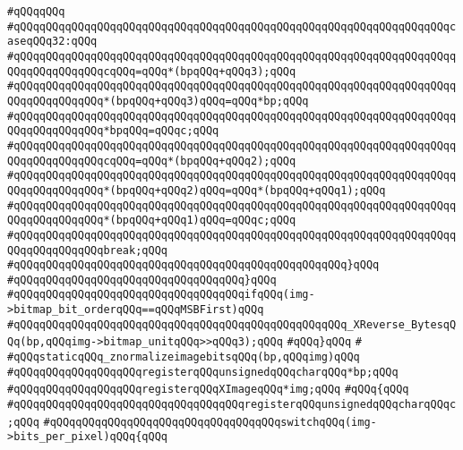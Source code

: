 \verb|#qQQqqQQq|\newline
\verb|#qQQqqQQqqQQqqQQqqQQqqQQqqQQqqQQqqQQqqQQqqQQqqQQqqQQqqQQqqQQqqQQqqQQqcaseqQQq32:qQQq|\newline
\verb|#qQQqqQQqqQQqqQQqqQQqqQQqqQQqqQQqqQQqqQQqqQQqqQQqqQQqqQQqqQQqqQQqqQQqqQQqqQQqqQQqqQQqcqQQq=qQQq*(bpqQQq+qQQq3);qQQq|\newline
\verb|#qQQqqQQqqQQqqQQqqQQqqQQqqQQqqQQqqQQqqQQqqQQqqQQqqQQqqQQqqQQqqQQqqQQqqQQqqQQqqQQqqQQq*(bpqQQq+qQQq3)qQQq=qQQq*bp;qQQq|\newline
\verb|#qQQqqQQqqQQqqQQqqQQqqQQqqQQqqQQqqQQqqQQqqQQqqQQqqQQqqQQqqQQqqQQqqQQqqQQqqQQqqQQqqQQq*bpqQQq=qQQqc;qQQq|\newline
\verb|#qQQqqQQqqQQqqQQqqQQqqQQqqQQqqQQqqQQqqQQqqQQqqQQqqQQqqQQqqQQqqQQqqQQqqQQqqQQqqQQqqQQqcqQQq=qQQq*(bpqQQq+qQQq2);qQQq|\newline
\verb|#qQQqqQQqqQQqqQQqqQQqqQQqqQQqqQQqqQQqqQQqqQQqqQQqqQQqqQQqqQQqqQQqqQQqqQQqqQQqqQQqqQQq*(bpqQQq+qQQq2)qQQq=qQQq*(bpqQQq+qQQq1);qQQq|\newline
\verb|#qQQqqQQqqQQqqQQqqQQqqQQqqQQqqQQqqQQqqQQqqQQqqQQqqQQqqQQqqQQqqQQqqQQqqQQqqQQqqQQqqQQq*(bpqQQq+qQQq1)qQQq=qQQqc;qQQq|\newline
\verb|#qQQqqQQqqQQqqQQqqQQqqQQqqQQqqQQqqQQqqQQqqQQqqQQqqQQqqQQqqQQqqQQqqQQqqQQqqQQqqQQqqQQqbreak;qQQq|\newline
\verb|#qQQqqQQqqQQqqQQqqQQqqQQqqQQqqQQqqQQqqQQqqQQqqQQqqQQq}qQQq|\newline
\verb|#qQQqqQQqqQQqqQQqqQQqqQQqqQQqqQQqqQQq}qQQq|\newline
\verb|#qQQqqQQqqQQqqQQqqQQqqQQqqQQqqQQqqQQqifqQQq(img->bitmap_bit_orderqQQq==qQQqMSBFirst)qQQq|\newline
\verb|#qQQqqQQqqQQqqQQqqQQqqQQqqQQqqQQqqQQqqQQqqQQqqQQqqQQq_XReverse_BytesqQQq(bp,qQQqimg->bitmap_unitqQQq>>qQQq3);qQQq|\newline
\verb|#qQQq}qQQq|\newline
\verb|#|\newline
\verb|#qQQqstaticqQQq_znormalizeimagebitsqQQq(bp,qQQqimg)qQQq|\newline
\verb|#qQQqqQQqqQQqqQQqqQQqregisterqQQqunsignedqQQqcharqQQq*bp;qQQq|\newline
\verb|#qQQqqQQqqQQqqQQqqQQqregisterqQQqXImageqQQq*img;qQQq|\newline
\verb|#qQQq{qQQq|\newline
\verb|#qQQqqQQqqQQqqQQqqQQqqQQqqQQqqQQqqQQqregisterqQQqunsignedqQQqcharqQQqc;qQQq|\newline
\verb|#qQQqqQQqqQQqqQQqqQQqqQQqqQQqqQQqqQQqswitchqQQq(img->bits_per_pixel)qQQq{qQQq|\newline

